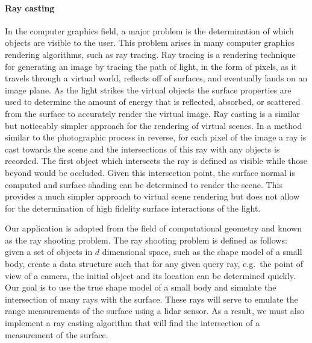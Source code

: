 \paragraph{Ray casting}

In the computer graphics field, a major problem is the determination of which objects are visible to the user.
This problem arises in many computer graphics rendering algorithms, such as ray tracing.
Ray tracing is a rendering technique for generating an image by tracing the path of light, in the form of pixels, as it travels through a virtual world, reflects off of surfaces, and eventually lands on an image plane.
As the light strikes the virtual objects the surface properties are used to determine the amount of energy that is reflected, absorbed, or scattered from the surface to accurately render the virtual image. 
Ray casting is a similar but noticeably simpler approach for the rendering of virtual scenes.
In a method similar to the photographic process in reverse, for each pixel of the image a ray is cast towards the scene and the intersections of this ray with any objects is recorded.
The first object which intersects the ray is defined as visible while those beyond would be occluded.
Given this intersection point, the surface normal is computed and surface shading can be determined to render the scene.
This provides a much simpler approach to virtual scene rendering but does not allow for the determination of high fidelity surface interactions of the light.

Our application is adopted from the field of computational geometry and known as the ray shooting problem.
The ray shooting problem is defined as follows: given a set of objects in \( d \) dimensional space, such as the shape model of a small body, create a data structure such that for any given query ray, e.g.\ the point of view of a camera, the initial object and its location can be determined quickly.
Our goal is to use the true shape model of a small body and simulate the intersection of many rays with the surface.
These rays will serve to emulate the range measurements of the surface using a \gls{lidar} sensor.
As a result, we must also implement a ray casting algorithm that will find the intersection of a measurement of the surface. 

